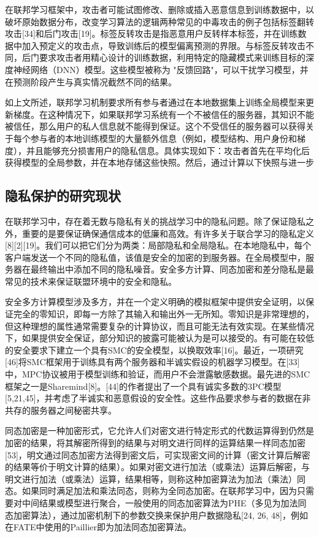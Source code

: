 在联邦学习框架中，攻击者可能试图修改、删除或插入恶意信息到训练数据中，以破坏原始数据分布，改变学习算法的逻辑两种常见的中毒攻击的例子包括标签翻转攻击[34]和后门攻击[19]。标签反转攻击是指恶意用户反转样本标签，并在训练数据中加入预定义的攻击点，导致训练后的模型偏离预测的界限。与标签反转攻击不同，后门要求攻击者用精心设计的训练数据，利用特定的隐藏模式来训练目标的深度神经网络（DNN）模型。这些模型被称为 "反馈回路"，可以干扰学习模型，并在预测阶段产生与真实情况截然不同的结果。

如上文所述，联邦学习机制要求所有参与者通过在本地数据集上训练全局模型来更新梯度。在这种情况下，如果联邦学习系统有一个不被信任的服务器，其知识不能被信任，那么用户的私人信息就不能得到保证。这个不受信任的服务器可以获得关于每个参与者的本地训练模型的大量额外信息（例如，模型结构、用户身份和梯度），并且能够充分损害用户的隐私信息。具体实现如下：攻击者首先在平均化后获得模型的全局参数，并在本地存储这些快照。然后，通过计算以下快照与进一步

\subsection{隐私保护的研究现状}
在联邦学习中，存在着无数与隐私有关的挑战学习中的隐私问题。除了保证隐私之外，重要的是要保证确保通信成本的低廉和高效。有许多关于联合学习的隐私定义[8][2][19]。我们可以把它们分为两类：局部隐私和全局隐私。在本地隐私中，每个客户端发送一个不同的隐私值，该值是安全的加密的到服务器。在全局模型中，服务器在最终输出中添加不同的隐私噪音。安全多方计算、同态加密和差分隐私是最常见的技术来保证联盟环境中的安全和隐私。

安全多方计算模型涉及多方，并在一个定义明确的模拟框架中提供安全证明，以保证完全的零知识，即每一方除了其输入和输出外一无所知。零知识是非常理想的，但这种理想的属性通常需要复杂的计算协议，而且可能无法有效实现。在某些情况下，如果提供安全保证，部分知识的披露可能被认为是可以接受的。有可能在较低的安全要求下建立一个具有SMC的安全模型，以换取效率[16]。最近，一项研究[46]将SMC框架用于训练具有两个服务器和半诚实假设的机器学习模型。在[33]中，MPC协议被用于模型训练和验证，而用户不会泄露敏感数据。最先进的SMC框架之一是Sharemind[8]。[44]的作者提出了一个具有诚实多数的3PC模型[5,21,45]，并考虑了半诚实和恶意假设的安全性。这些作品要求参与者的数据在非共存的服务器之间秘密共享。

同态加密是一种加密形式，它允许人们对密文进行特定形式的代数运算得到仍然是加密的结果，将其解密所得到的结果与对明文进行同样的运算结果一样同态加密[53]，明文通过同态加密方法得到密文后，可实现密文间的计算（密文计算后解密的结果等价于明文计算的结果）。如果对密文进行加法（或乘法）运算后解密，与明文进行加法（或乘法）运算，结果相等，则称这种加密算法为加法（乘法）同态。如果同时满足加法和乘法同态，则称为全同态加密。在联邦学习中，因为只需要对中间结果或模型进行聚合，一般使用的同态加密算法为PHE（多见为加法同态加密算法），通过加密机制下的参数交换来保护用户数据隐私[24, 26, 48]，例如在FATE中使用的Paillier即为加法同态加密算法。

